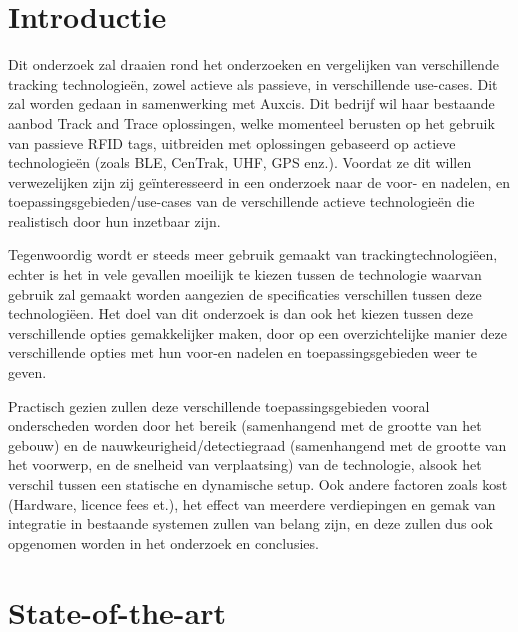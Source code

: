 \section{Introductie} %
\label{sec:introductie}

Dit onderzoek zal draaien rond het onderzoeken en vergelijken van verschillende tracking technologieën, zowel actieve als passieve, in verschillende use-cases. Dit zal worden gedaan in samenwerking met Auxcis. Dit bedrijf wil haar bestaande aanbod Track and Trace oplossingen, welke momenteel berusten op het gebruik van passieve RFID tags, uitbreiden met oplossingen gebaseerd op actieve technologieën (zoals BLE, CenTrak, UHF, GPS enz.). Voordat ze dit willen verwezelijken zijn zij geïnteresseerd in een onderzoek naar de voor- en nadelen, en toepassingsgebieden/use-cases van de verschillende actieve technologieën die realistisch door hun inzetbaar zijn.

Tegenwoordig wordt er steeds meer gebruik gemaakt van trackingtechnologiëen, echter is het in vele gevallen moeilijk te kiezen tussen de technologie waarvan gebruik zal gemaakt worden aangezien de specificaties verschillen tussen deze technologiëen. Het doel van dit onderzoek is dan ook het kiezen tussen deze verschillende opties gemakkelijker maken, door op een overzichtelijke manier deze verschillende opties met hun voor-en nadelen en toepassingsgebieden weer te geven.

Practisch gezien zullen deze verschillende toepassingsgebieden vooral onderscheden worden door het bereik (samenhangend met de grootte van het gebouw) en de nauwkeurigheid/detectiegraad (samenhangend met de grootte van het voorwerp, en de snelheid van verplaatsing) van de technologie, alsook het verschil tussen een statische en dynamische setup. Ook andere factoren zoals kost (Hardware, licence fees et.), het effect van meerdere verdiepingen en gemak van integratie in bestaande systemen zullen van belang zijn, en deze zullen dus ook opgenomen worden in het onderzoek en conclusies.


\section{State-of-the-art}
\label{sec:state-of-the-art}

